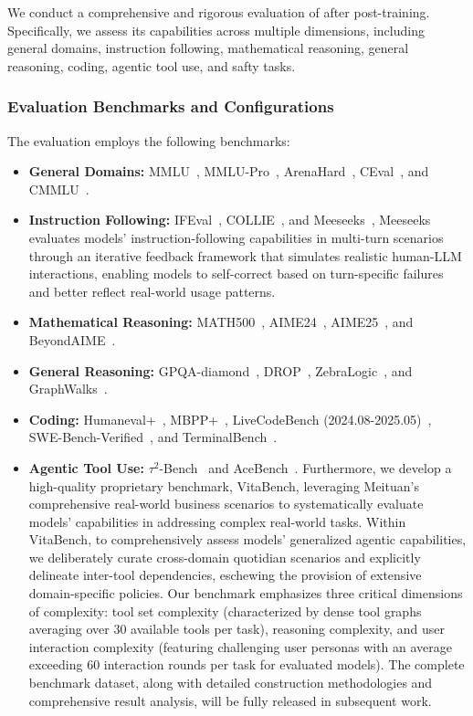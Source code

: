 We conduct a comprehensive and rigorous evaluation of \longcat after post-training. Specifically, we assess its capabilities across multiple dimensions, including general domains, instruction following, mathematical reasoning, general reasoning, coding, agentic tool use, and safty tasks.

\subsubsection{Evaluation Benchmarks and Configurations}

The evaluation employs the following benchmarks:
\begin{itemize}
    \item \textbf{General Domains:} MMLU~\citep{hendrycks2021measuringmassivemultitasklanguage}, MMLU-Pro~\citep{wang2024mmluprorobustchallengingmultitask}, 
    ArenaHard~\citep{li2024crowdsourced, arenahard2024}, CEval~\citep{huang2023ceval}, and CMMLU~\citep{li2023cmmlu}.
    \item \textbf{Instruction Following:} IFEval~\citep{zhou2023ifeval}, COLLIE~\citep{yao2024collie}, and Meeseeks~\citep{meeseeks}, Meeseeks evaluates models' instruction-following capabilities in multi-turn scenarios through an iterative feedback framework that simulates realistic human-LLM interactions, enabling models to self-correct based on turn-specific failures and better reflect real-world usage patterns.
    \item \textbf{Mathematical Reasoning:}  MATH500~\citep{math500}, AIME24~\citep{AIME24}, AIME25~\citep{AIME25}, and BeyondAIME~\citep{bytedance_seed_2025_beyondaime}.
    \item \textbf{General Reasoning:}  GPQA-diamond~\citep{rein2023gpqagraduatelevelgoogleproofqa}, DROP~\citep{drop}, ZebraLogic~\citep{lin2025zebralogic}, and GraphWalks~\citep{graphwalks}.
    \item \textbf{Coding:}  Humaneval+~\citep{humanevalmbppplus}, MBPP+~\citep{humanevalmbppplus}, 
    LiveCodeBench (2024.08-2025.05)~\citep{jain2025livecodebench}, 
    SWE-Bench-Verified~\citep{jimenez2024swebench}, and TerminalBench~\citep{tbench_2025}.
    \item \textbf{Agentic Tool Use:}  $\tau^2$-Bench~\citep{tau2-bench} and AceBench~\citep{chen2025acebench}. Furthermore, we develop a high-quality proprietary benchmark, VitaBench, leveraging Meituan's comprehensive real-world business scenarios to systematically evaluate models' capabilities in addressing complex real-world tasks. Within VitaBench, to comprehensively assess models' generalized agentic capabilities, we deliberately curate cross-domain quotidian scenarios and explicitly delineate inter-tool dependencies, eschewing the provision of extensive domain-specific policies. Our benchmark emphasizes three critical dimensions of complexity: tool set complexity (characterized by dense tool graphs averaging over 30 available tools per task), reasoning complexity, and user interaction complexity (featuring challenging user personas with an average exceeding 60 interaction rounds per task for evaluated models). The complete benchmark dataset, along with detailed construction methodologies and comprehensive result analysis, will be fully released in subsequent work.

\end{itemize}
